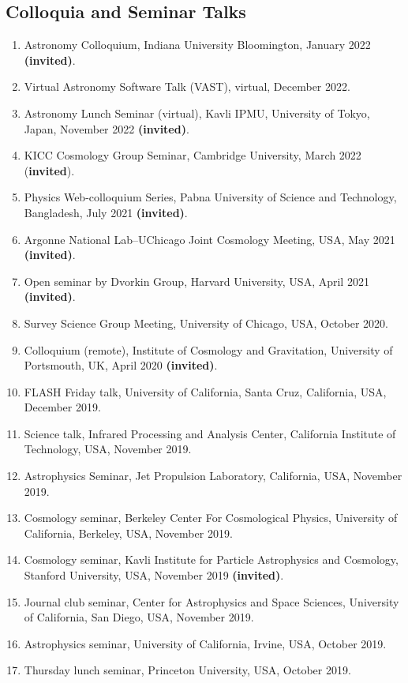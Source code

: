 \documentclass[margin, line]{res}
\begin{document}
\begin{resume}
\section{\sc Colloquia and Seminar Talks}
\begin{enumerate}
	\item Astronomy Colloquium, Indiana University Bloomington, January 2022 \textbf{(invited)}.
	\item Virtual Astronomy Software Talk (VAST), virtual, December 2022.
	\item Astronomy Lunch Seminar (virtual), Kavli IPMU, University of Tokyo, Japan, November 2022 \textbf{(invited)}.
	\item KICC Cosmology Group Seminar, Cambridge University, March 2022 (\textbf{invited}).
	\item Physics Web-colloquium Series, Pabna University of Science and Technology, Bangladesh, July 2021 \textbf{(invited)}.
	\item Argonne National Lab--UChicago Joint Cosmology Meeting, USA, May 2021 \textbf{(invited)}.
	\item Open seminar by Dvorkin Group, Harvard University, USA, April 2021 \textbf{(invited)}.
	\item Survey Science Group Meeting, University of Chicago, USA, October 2020.
	\item Colloquium (remote), Institute of Cosmology and Gravitation, University of Portsmouth, UK, April 2020 \textbf{(invited)}.
	\item FLASH Friday talk, University of California, Santa Cruz, California, USA, December 2019.
	\item Science talk, Infrared Processing and Analysis Center, California Institute of Technology, USA, November 2019.
	\item Astrophysics Seminar, Jet Propulsion Laboratory, California, USA, November 2019.
	\item Cosmology seminar, Berkeley Center For Cosmological Physics, University of California, Berkeley, USA, November 2019. 
	\item Cosmology seminar, Kavli Institute for Particle Astrophysics and Cosmology, Stanford University, USA, November 2019 \textbf{(invited)}.
	\item Journal club seminar, Center for Astrophysics and Space Sciences, University of California, San Diego, USA, November 2019.
	\item Astrophysics seminar, University of California, Irvine, USA, October 2019.
	\item Thursday lunch seminar, Princeton University, USA, October 2019.

\end{enumerate}
\end{resume}
\end{document}
